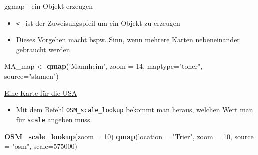 \documentclass[ignorenonframetext,]{beamer}
\newenvironment{Shaded}{\begin{snugshade}}{\end{snugshade}}
\newcommand{\KeywordTok}[1]{\textcolor[rgb]{0.13,0.29,0.53}{\textbf{#1}}}
\newcommand{\DataTypeTok}[1]{\textcolor[rgb]{0.13,0.29,0.53}{#1}}
\newcommand{\DecValTok}[1]{\textcolor[rgb]{0.00,0.00,0.81}{#1}}
\newcommand{\StringTok}[1]{\textcolor[rgb]{0.31,0.60,0.02}{#1}}
\newcommand{\NormalTok}[1]{#1}
\providecommand{\tightlist}{%
  \setlength{\itemsep}{0pt}\setlength{\parskip}{0pt}}
\begin{document}
\begin{frame}[fragile]{ggmap - ein Objekt erzeugen}

\begin{itemize}
\tightlist
\item
  \texttt{\textless{}-} ist der Zuweisungspfeil um ein Objekt zu
  erzeugen
\item
  Dieses Vorgehen macht bspw. Sinn, wenn mehrere Karten nebeneinander
  gebraucht werden.
\end{itemize}

\begin{Shaded}
\begin{Highlighting}[]
\NormalTok{MA_map <-}\StringTok{ }\KeywordTok{qmap}\NormalTok{(}\StringTok{'Mannheim'}\NormalTok{, }
               \DataTypeTok{zoom =} \DecValTok{14}\NormalTok{,}
               \DataTypeTok{maptype=}\StringTok{"toner"}\NormalTok{,}
               \DataTypeTok{source=}\StringTok{"stamen"}\NormalTok{)}
\end{Highlighting}
\end{Shaded}

\end{frame}

\begin{frame}[fragile]{\href{https://blog.dominodatalab.com/geographic-visualization-with-rs-ggmaps/}{Eine
Karte für die USA}}

\begin{itemize}
\tightlist
\item
  Mit dem Befehl \texttt{OSM\_scale\_lookup} bekommt man heraus, welchen
  Wert man für \texttt{scale} angeben muss.
\end{itemize}

\begin{Shaded}
\begin{Highlighting}[]
\KeywordTok{OSM_scale_lookup}\NormalTok{(}\DataTypeTok{zoom =} \DecValTok{10}\NormalTok{)}
\KeywordTok{qmap}\NormalTok{(}\DataTypeTok{location =} \StringTok{"Trier"}\NormalTok{, }\DataTypeTok{zoom =} \DecValTok{10}\NormalTok{, }\DataTypeTok{source =} \StringTok{"osm"}\NormalTok{,}
     \DataTypeTok{scale=}\DecValTok{575000}\NormalTok{)}
\end{Highlighting}
\end{Shaded}

\end{frame}
\end{document}
